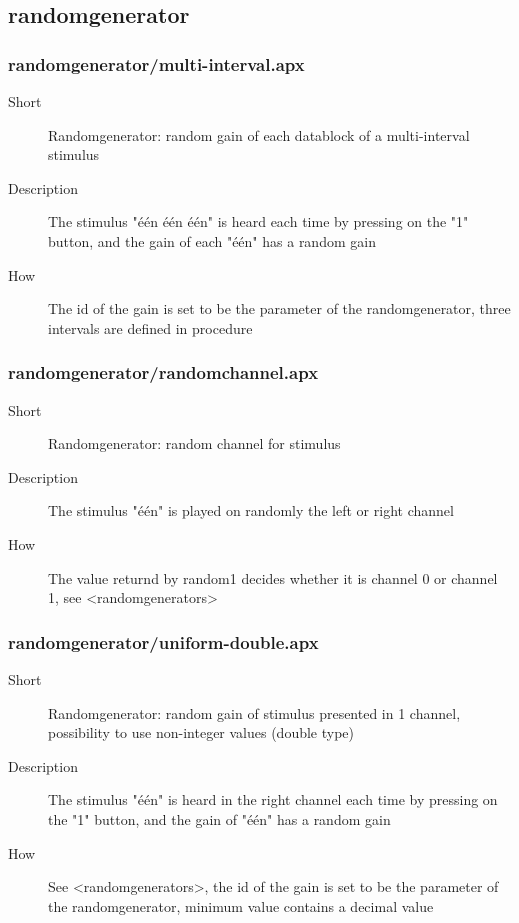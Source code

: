 \subsection{randomgenerator}
\subsubsection{randomgenerator/multi-interval.apx}
\begin{description}
\item[Short] 
 Randomgenerator: random gain of each datablock of a multi-interval stimulus
\item[Description] 
 The stimulus "één één één" is heard each time by pressing on the "1" button, and the gain of each "één" has a random gain
\item[How] 
 The id of the gain is set to be the parameter of the randomgenerator, three intervals are defined in procedure
\end{description}

\subsubsection{randomgenerator/randomchannel.apx}
\begin{description}
\item[Short] 
 Randomgenerator: random channel for stimulus
\item[Description] 
 The stimulus "één" is played on randomly the left or right channel
\item[How] 
 The value returnd by random1 decides whether it is channel 0 or channel 1, see \textless{}randomgenerators\textgreater{}
\end{description}

\subsubsection{randomgenerator/uniform-double.apx}
\begin{description}
\item[Short] 
 Randomgenerator: random gain of stimulus presented in 1 channel, possibility to use non-integer values (double type)
\item[Description] 
 The stimulus "één" is heard in the right channel each time by pressing on the "1" button, and the gain of "één" has a random gain
\item[How] 
 See \textless{}randomgenerators\textgreater{}, the id of the gain is set to be the parameter of the randomgenerator, minimum value contains a decimal value
\end{description}

